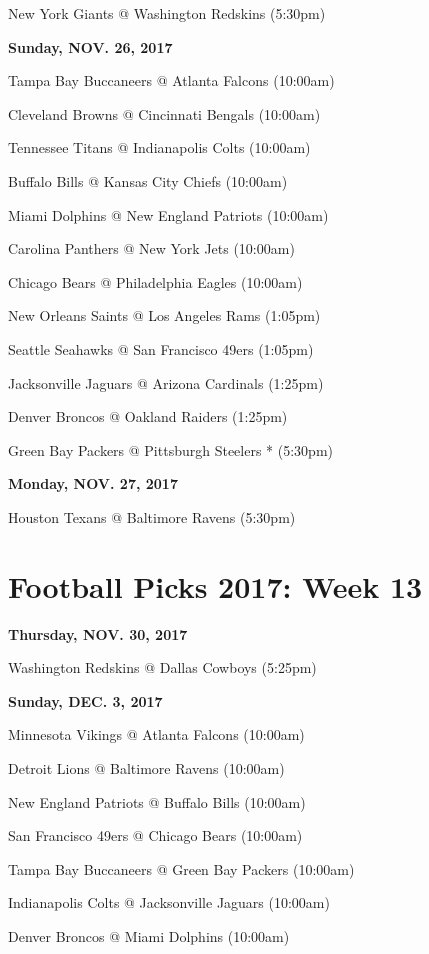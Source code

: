 \documentclass[11pt, letterpaper]{article}
\begin{document}
New York Giants @ Washington Redskins (5:30pm)\par
\noindent \normalsize \textbf{Sunday, NOV. 26, 2017} \par
Tampa Bay Buccaneers @ Atlanta Falcons (10:00am)\par
Cleveland Browns @ Cincinnati Bengals (10:00am)\par
Tennessee Titans @ Indianapolis Colts (10:00am)\par
Buffalo Bills @ Kansas City Chiefs (10:00am)\par
Miami Dolphins @ New England Patriots (10:00am)\par
Carolina Panthers @ New York Jets (10:00am)\par
Chicago Bears @ Philadelphia Eagles (10:00am)\par
New Orleans Saints @ Los Angeles Rams (1:05pm)\par
Seattle Seahawks @ San Francisco 49ers (1:05pm)\par
Jacksonville Jaguars @ Arizona Cardinals (1:25pm)\par
Denver Broncos @ Oakland Raiders (1:25pm)\par
Green Bay Packers @ Pittsburgh Steelers * (5:30pm)\par
\noindent \normalsize \textbf{Monday, NOV. 27, 2017} \par
Houston Texans @ Baltimore Ravens (5:30pm)\par
\newpage \section*{\LARGE Football Picks 2017: Week 13}
\noindent \normalsize \textbf{Thursday, NOV.    30, 2017} \par
Washington Redskins @ Dallas Cowboys (5:25pm)\par
\noindent \normalsize \textbf{Sunday, DEC. 3, 2017} \par
Minnesota Vikings @ Atlanta Falcons (10:00am)\par
Detroit Lions @ Baltimore Ravens (10:00am)\par
New England Patriots @ Buffalo Bills (10:00am)\par
San Francisco 49ers @ Chicago Bears (10:00am)\par
Tampa Bay Buccaneers @ Green Bay Packers (10:00am)\par
Indianapolis Colts @ Jacksonville Jaguars (10:00am)\par
Denver Broncos @ Miami Dolphins (10:00am)\par
\end{document}
